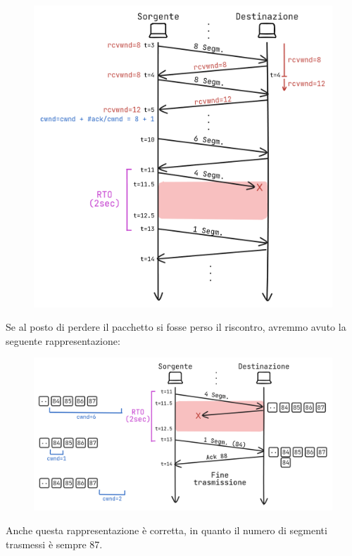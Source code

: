 \documentclass[a4paper]{article}
\begin{document}
\begin{figure}[H]
  \centering
  \includegraphics[width=1\textwidth]{../figures/es-tcp4}
\end{figure}

\vspace{1em}
\noindent
Se al posto di perdere il pacchetto si fosse perso il riscontro, avremmo avuto la seguente
rappresentazione:
\begin{figure}[H]
  \centering
  \includegraphics[width=1\textwidth]{../figures/es-tcp4.1}
\end{figure}
\noindent
Anche questa rappresentazione è corretta, in quanto il numero di segmenti trasmessi è
sempre 87.
\end{document}

